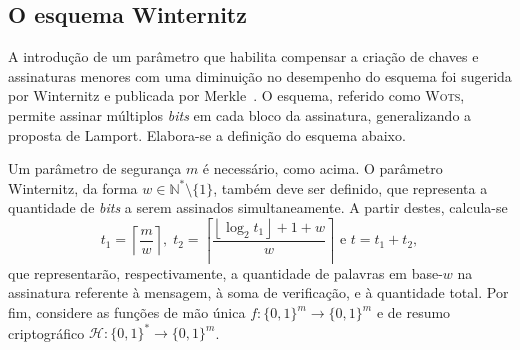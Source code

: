 \documentclass[12pt,notitlepage]{report}
\newcommand{\hh}{\mathcal{H}}
\newcommand{\binwds}[1]{\{0, 1\}^{#1}}
\newcommand{\fhash}[1]{\hh{} : \binwds{*} \longrightarrow \binwds{#1}}
\begin{document}
\subsection{O esquema Winternitz}

A introdução de um parâmetro que habilita compensar a criação de chaves e
assinaturas menores com uma diminuição no desempenho do esquema foi sugerida
por Winternitz e publicada por Merkle~\cite{Merkle:1989:CDS:118209.118230}.  O
esquema, referido como \textsc{Wots}, permite assinar múltiplos \emph{bits} em
cada bloco da assinatura, generalizando a proposta de Lamport. Elabora-se a
definição do esquema abaixo.

Um parâmetro de segurança $m$ é necessário, como acima. O parâmetro Winternitz,
da forma $w \in \mathbb{N}^{*}\setminus\{1\}$, também deve ser definido, que representa a
quantidade de \emph{bits} a serem assinados simultaneamente.  A partir destes,
calcula-se $$t_1 = \left\lceil \frac{m}{w} \right\rceil, \; t_2 = \left\lceil
\frac{\left\lfloor \log_2 t_1 \right\rfloor + 1 + w}{w} \right\rceil \text{ e }
t = t_1 + t_2,$$ que representarão, respectivamente, a quantidade de palavras
em base-$w$ na assinatura referente à mensagem, à soma de verificação, e à
quantidade total.  Por fim, considere as funções de mão única $f : \binwds{m}
\longrightarrow \binwds{m}$ e de resumo criptográfico $\fhash{m}$.
\end{document}
